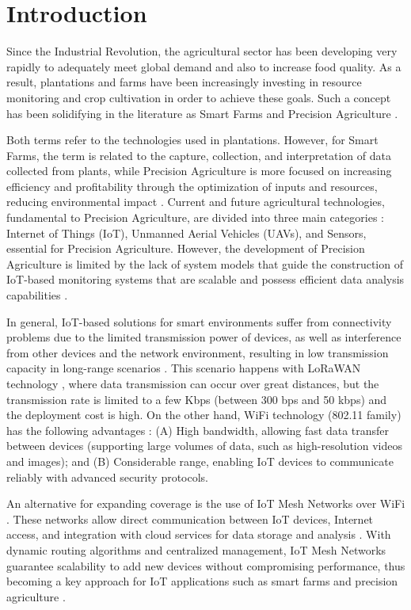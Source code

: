 \documentclass[journal]{IEEEtran}
\begin{document}
\section{Introduction}

Since the Industrial Revolution, the agricultural sector has been developing very rapidly to adequately meet global demand and also to increase food quality. As a result, plantations and farms have been increasingly investing in resource monitoring and crop cultivation in order to achieve these goals. Such a concept has been solidifying in the literature as Smart Farms and Precision Agriculture \cite{karunathilake2023path}.

Both terms refer to the technologies used in plantations. However, for Smart Farms, the term is related to the capture, collection, and interpretation of data collected from plants, while Precision Agriculture is more focused on increasing efficiency and profitability through the optimization of inputs and resources, reducing environmental impact \cite{prakash2023advancements}. Current and future agricultural technologies, fundamental to Precision Agriculture, are divided into three main categories \cite{8804834}: Internet of Things (IoT), Unmanned Aerial Vehicles (UAVs), and Sensors, essential for Precision Agriculture. However, the development of Precision Agriculture is limited by the lack of system models that guide the construction of IoT-based monitoring systems that are scalable and possess efficient data analysis capabilities \cite{karunathilake2023path}.

In general, IoT-based solutions for smart environments suffer from connectivity problems due to the limited transmission power of devices, as well as interference from other devices and the network environment, resulting in low transmission capacity in long-range scenarios \cite{Brito-LNet-2026}. This scenario happens with LoRaWAN technology \cite{czeczot2023analysis}, where data transmission can occur over great distances, but the transmission rate is limited to a few Kbps (between 300 bps and 50 kbps) and the deployment cost is high. On the other hand, WiFi technology (802.11 family) has the following advantages \cite{IJES-2022-129802}: (A) High bandwidth, allowing fast data transfer between devices (supporting large volumes of data, such as high-resolution videos and images); and (B) Considerable range, enabling IoT devices to communicate reliably with advanced security protocols.

An alternative for expanding coverage is the use of IoT Mesh Networks over WiFi \cite{morman2023iot}. These networks allow direct communication between IoT devices, Internet access, and integration with cloud services for data storage and analysis \cite{10-1145-1858477-1858479, gomes2011using}. With dynamic routing algorithms and centralized management, IoT Mesh Networks guarantee scalability to add new devices without compromising performance, thus becoming a key approach for IoT applications such as smart farms and precision agriculture \cite{10-1007-978-3-642-13789-1_1,gaikwad2023wireless}.
\end{document}
